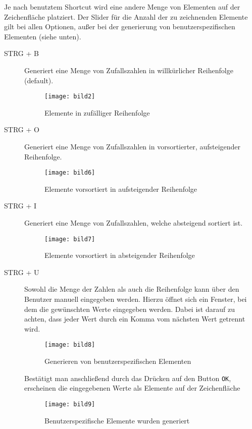 Je nach benutztem Shortcut wird eine andere Menge von Elementen auf der Zeichenfläche platziert. Der Slider für die Anzahl der zu zeichnenden Elemente gilt bei allen Optionen, außer bei der generierung von benutzerspezifischen Elementen (siehe unten).

\begin{description}
\item[STRG + B] Generiert eine Menge von Zufallszahlen in willkürlicher Reihenfolge (default).

\begin{figure}[!htb]
    \centering
      \texttt{[image: bild2]}
    \caption{Elemente in zufälliger Reihenfolge}
\end{figure}

\item[STRG + O] Generiert eine Menge von Zufallszahlen in vorsortierter, aufsteigender Reihenfolge.

\begin{figure}[!htb]
    \centering
      \texttt{[image: bild6]}
    \caption{Elemente vorsortiert in aufsteigender Reihenfolge}
\end{figure}

\item[STRG + I] Generiert eine Menge von Zufallszahlen, welche absteigend sortiert ist.

\begin{figure}[!htb]
    \centering
      \texttt{[image: bild7]}
    \caption{Elemente vorsortiert in absteigender Reihenfolge}
\end{figure}

\item[STRG + U] Sowohl die Menge der Zahlen als auch die Reihenfolge kann über den Benutzer manuell eingegeben werden. Hierzu öffnet sich ein Fenster, bei dem die gewünschten Werte eingegeben werden. Dabei ist darauf zu achten, dass jeder Wert durch ein Komma vom nächsten Wert getrennt wird.

\begin{figure}[!htb]
    \centering
      \texttt{[image: bild8]}
    \caption{Generieren von benutzerspezifischen Elementen}
\end{figure}

Bestätigt man anschließend durch das Drücken auf den Button \texttt{OK}, erscheinen die eingegebenen Werte als Elemente auf der Zeichenfläche

\begin{figure}[!htb]
    \centering
      \texttt{[image: bild9]}
    \caption{Benutzerspezifische Elemente wurden generiert}
\end{figure}
\end{description}





